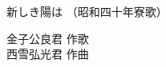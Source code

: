 \documentclass[10pt,b5j]{tarticle} %
\begin{document}
\begin{minipage}[c]{0.7\hsize} %
    \begin{center}
        {\LARGE
            新しき陽は %
        }
        {\small 
            （昭和四十年寮歌） %
        }
    \end{center}
\end{minipage}
\begin{minipage}[c]{0.3\hsize} %
    \begin{flushright} %
        金子公良君 作歌\\西雪弘光君 作曲 %
    \end{flushright}
\end{minipage}
\end{document}
